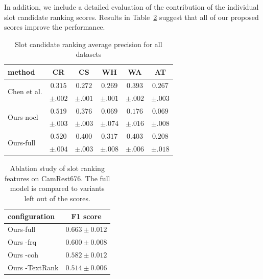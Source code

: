 In addition, we include a detailed evaluation of the contribution of the individual slot candidate ranking scores.
Results in Table~\ref{table:ablation-ranking} suggest that all of our proposed scores improve the performance.
\begin{table}[tp]
    \centering
    \small
    \begin{tabular}{lccccc}
    \hline
    \textbf{method} & \textbf{CR} & \textbf{CS} & \textbf{WH} & \textbf{WA} & \textbf{AT} \\
    \hline
    \multirow{2}{*}{Chen et al.} & $0.315$ & $0.272$ & $0.269$ & $0.393$ & $\pmb{0.267}$ \\
    & $\pm .002$ & $\pm .001$ & $ \pm .001$ & $ \pm .002$ & $ \pm .003$ \\ 
    \multirow{2}{*}{Ours-nocl} & $\pmb{0.519}$ & $0.376$ & $0.069$ & $0.176$ & $0.069$ \\
    & $\pm .003$ & $ \pm .003$ & $ \pm .074$ & $ \pm .016$ & $ \pm .008$ \\
    \multirow{2}{*}{Ours-full} & $\pmb{0.520}$ & $\pmb{0.400}$ & $\pmb{0.317}$ & $\pmb{0.403}$ & $0.208$ \\
    & $\pm .004$ & $\pm .003$ & $\pm .008$ & $ \pm .006$ & $ \pm .018$ \\

\hline
    \end{tabular}
    
    \caption{Slot candidate ranking average precision for all datasets}
    \label{table:avg-precision}
\end{table}
\begin{table}[tp]
    \centering
    \small
    \begin{tabular}{lc}
    \hline
     \textbf{configuration} & \bf F1 score\\
     \hline
     Ours-full & $\mathbf{0.663} \pm 0.012$ \\
     Ours -frq & $0.600 \pm 0.008$ \\
     Ours -coh & $0.582 \pm 0.012$ \\
     Ours -TextRank & $0.514 \pm 0.006$ \\

     \hline
    \end{tabular}
    \caption{Ablation study of slot ranking features on CamRest676. The full model is compared to variants left out of the scores.}
    \label{table:ablation-ranking}
\end{table}

